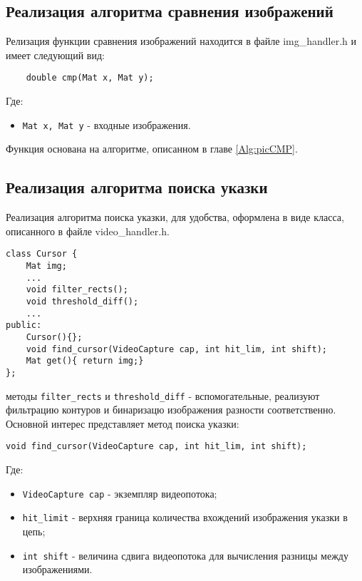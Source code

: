 \documentclass[oneside,final,14pt]{extreport}
\begin{document}
\subsection{Реализация алгоритма сравнения изображений}

Релизация функции сравнения изображений находится в файле img\_handler.h и имеет следующий вид:

\begin{verbatim}
	double cmp(Mat x, Mat y);
\end{verbatim}

Где:
\begin{itemize}
\item \verb!Mat x, Mat y! - входные изображения.
\end{itemize}
 

Функция основана на алгоритме, описанном в главе \ref{Alg:picCMP}.
 
\subsection{Реализация алгоритма поиска указки}

Реализация алгоритма поиска указки, для удобства, оформлена в виде класса, описанного в файле video\_handler.h.
\begin{verbatim}
class Cursor {	
	Mat img;
	...
    void filter_rects();
    void threshold_diff();
    ...
public:
    Cursor(){};
    void find_cursor(VideoCapture cap, int hit_lim, int shift);
    Mat get(){ return img;}
};
\end{verbatim}

методы \verb!filter_rects! и \verb!threshold_diff! - вспомогательные, реализуют фильтрацию контуров и бинаризацю изображения разности соответственно. 
Основной интерес представляет метод поиска указки:

\begin{verbatim}
void find_cursor(VideoCapture cap, int hit_lim, int shift);
\end{verbatim}

Где: 
\begin{itemize}
\item \verb!VideoCapture cap! - экземпляр видеопотока;
\item \verb!hit_limit! - верхняя граница количества вхождений изображения указки в цепь;
\item \verb!int shift! - величина сдвига видеопотока для вычисления разницы между изображениями. 
\end{itemize}
\end{document}
